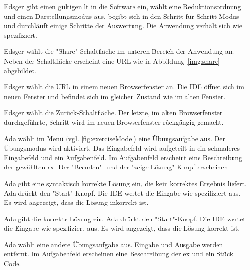 \documentclass[parskip=full,11pt,twoside]{scrartcl}
\begin{document}

{Edsger gibt einen gültigen \gls{lt} in die Software ein, wählt eine Reduktionsordnung und einen
Darstellungsmodus aus, begibt sich in den Schritt-für-Schritt-Modus und durchläuft einige
Schritte der Auswertung.}
{Die Anwendung verhält sich wie spezifiziert.}

{Edsger wählt die "Share"-Schaltfläche im unteren Bereich der Anwendung an.}
{Neben der Schaltfläche erscheint eine URL wie in Abbildung~\ref{img:share}
abgebildet.}

{Edsger wählt die URL in einem neuen Browserfenster an.}
{Die IDE öffnet sich im neuen Fenster und befindet sich im gleichen Zustand wie im
alten Fenster.}

{Edsger wählt die Zurück-Schaltfläche.}
{Der letzte, im alten Browserfenster durchgeführte, Schritt wird im neuen Browserfenster
rückgängig gemacht.}


{Ada wählt im Menü (vgl. \cref{fig:exerciseMode}) eine Übungsaufgabe aus.}
{Der Übungsmodus wird aktiviert. 
 Das Eingabefeld wird aufgeteilt in ein schmaleres Eingabefeld und ein Aufgabenfeld.
 Im Aufgabenfeld erscheint eine Beschreibung der gewählten \gls{ex}.
 Der "Beenden"- und der "zeige Lösung"-Knopf erscheinen.}

{Ada gibt eine syntaktisch korrekte Lösung ein, die kein korrektes Ergebnis liefert.
 Ada drückt den "Start"-Knopf.}
{Die IDE wertet die Eingabe wie spezifiziert aus.
 Es wird angezeigt, dass die Lösung inkorrekt ist.}

{Ada gibt die korrekte Lösung ein. Ada drückt den "Start"-Knopf.}
{Die IDE wertet die Eingabe wie spezifiziert aus.
 Es wird angezeigt, dass die Lösung korrekt ist.}
 
{Ada wählt eine andere Übungsaufgabe aus.}
{Eingabe und Ausgabe werden entfernt.
Im Aufgabenfeld erscheinen eine Beschreibung der \gls{ex} und ein Stück Code.}
\end{document}
